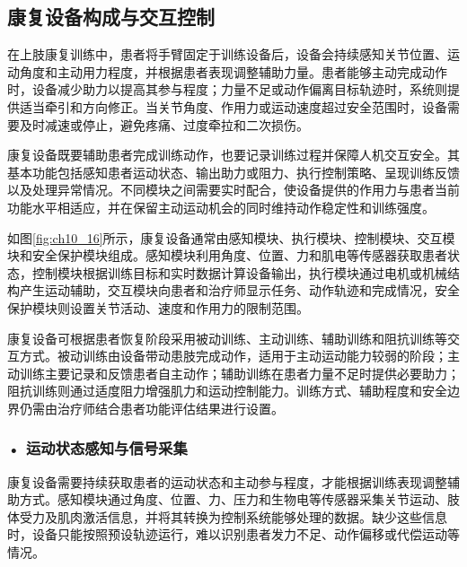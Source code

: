 \subsection{康复设备构成与交互控制}

在上肢康复训练中，患者将手臂固定于训练设备后，设备会持续感知关节位置、运动角度和主动用力程度，并根据患者表现调整辅助力量。患者能够主动完成动作时，设备减少助力以提高其参与程度；力量不足或动作偏离目标轨迹时，系统则提供适当牵引和方向修正。当关节角度、作用力或运动速度超过安全范围时，设备需要及时减速或停止，避免疼痛、过度牵拉和二次损伤。

康复设备既要辅助患者完成训练动作，也要记录训练过程并保障人机交互安全。其基本功能包括感知患者运动状态、输出助力或阻力、执行控制策略、呈现训练反馈以及处理异常情况。不同模块之间需要实时配合，使设备提供的作用力与患者当前功能水平相适应，并在保留主动运动机会的同时维持动作稳定性和训练强度。

如图\ref{fig:ch10_16}所示，康复设备通常由感知模块、执行模块、控制模块、交互模块和安全保护模块组成。感知模块利用角度、位置、力和肌电等传感器获取患者状态，控制模块根据训练目标和实时数据计算设备输出，执行模块通过电机或机械结构产生运动辅助，交互模块向患者和治疗师显示任务、动作轨迹和完成情况，安全保护模块则设置关节活动、速度和作用力的限制范围。

康复设备可根据患者恢复阶段采用被动训练、主动训练、辅助训练和阻抗训练等交互方式。被动训练由设备带动患肢完成动作，适用于主动运动能力较弱的阶段；主动训练主要记录和反馈患者自主动作；辅助训练在患者力量不足时提供必要助力；阻抗训练则通过适度阻力增强肌力和运动控制能力。训练方式、辅助程度和安全边界仍需由治疗师结合患者功能评估结果进行设置。


\par
\noindent\begin{minipage}{\textwidth}
\centering
{}
\label{fig:ch10_16}
\end{minipage}
\par

\subsubsection*{\textbf{• 运动状态感知与信号采集}}

康复设备需要持续获取患者的运动状态和主动参与程度，才能根据训练表现调整辅助方式。感知模块通过角度、位置、力、压力和生物电等传感器采集关节运动、肢体受力及肌肉激活信息，并将其转换为控制系统能够处理的数据。缺少这些信息时，设备只能按照预设轨迹运行，难以识别患者发力不足、动作偏移或代偿运动等情况。

